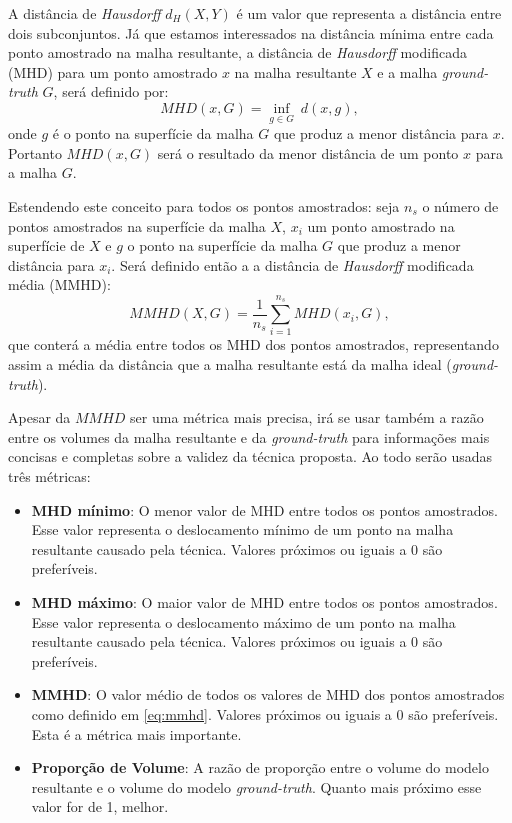 A distância de \textit{Hausdorff} $d_H(X,Y)$ é um valor que representa a distância entre dois subconjuntos. Já que estamos interessados na distância mínima entre cada ponto amostrado na malha resultante, a distância de \textit{Hausdorff} modificada (MHD) para um ponto amostrado $x$ na malha resultante $X$ e a malha \textit{ground-truth} $G$, será definido por:
\begin{equation}
	MHD(x,G) = \underset{g \in G}{\inf} \: d(x,g),
\end{equation}
onde $g$ é o ponto na superfície da malha $G$ que produz a menor distância para $x$. Portanto $MHD(x,G)$ será o resultado da menor distância de um ponto $x$ para a malha $G$. 

Estendendo este conceito para todos os pontos amostrados: seja $n_s$ o número de pontos amostrados na superfície da malha $X$, $x_i$ um ponto amostrado na superfície de $X$ e $g$ o ponto na superfície da malha $G$ que produz a menor distância para $x_i$. Será definido então a a distância de \textit{Hausdorff} modificada média (MMHD):
\begin{equation} \label{eq:mmhd}
	MMHD(X,G) = \frac{1}{n_s} \sum_{i=1}^{n_s}{MHD(x_i,G)},
\end{equation}
que conterá a média entre todos os MHD dos pontos amostrados, representando assim a média da distância que a malha resultante está da malha ideal (\textit{ground-truth}).

Apesar da $MMHD$ ser uma métrica mais precisa, irá se usar também a razão entre os volumes da malha resultante e da \textit{ground-truth} para informações mais concisas e completas sobre a validez da técnica proposta. Ao todo serão usadas três métricas:

\begin{itemize} 
    \item \textbf{MHD mínimo}: O menor valor de MHD entre todos os pontos amostrados. Esse valor representa o deslocamento mínimo de um ponto na malha resultante causado pela técnica. Valores próximos ou iguais a 0 são preferíveis.
    \item \textbf{MHD máximo}: O maior valor de MHD entre todos os pontos amostrados. Esse valor representa o deslocamento máximo de um ponto na malha resultante causado pela técnica. Valores próximos ou iguais a 0 são preferíveis.
    \item \textbf{MMHD}: O valor médio de todos os valores de MHD dos pontos amostrados como definido em \ref{eq:mmhd}. Valores próximos ou iguais a 0 são preferíveis. Esta é a métrica mais importante.
    \item \textbf{Proporção de Volume}: A razão de proporção entre o volume do modelo resultante e o volume do modelo \textit{ground-truth}. Quanto mais próximo esse valor for de 1, melhor.
\end{itemize}


